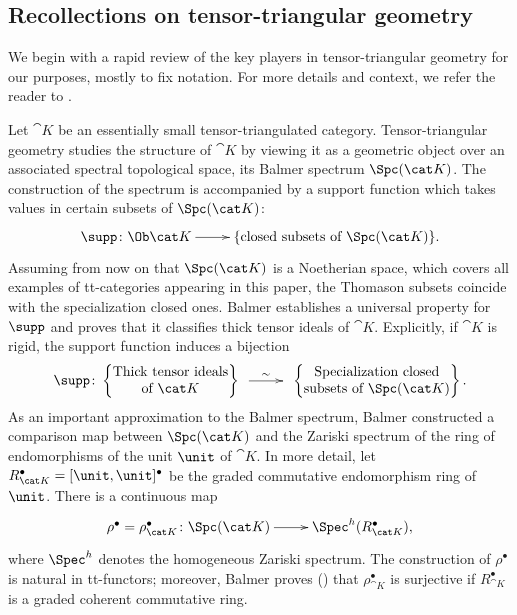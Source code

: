 \documentclass{amsart}%
\numberwithin{equation}{section}%
\theoremstyle{remark}
\begin{document}
\subsection{Recollections on tensor-triangular geometry}

We begin with a rapid review of the key players in tensor-triangular geometry for our purposes, mostly to fix notation. For more details and context, we refer the reader to \cite{Balmer05a}.

Let $\cat K$ be an essentially small tensor-triangulated category. Tensor-triangular geometry studies the structure of $\cat K$ by viewing it as a geometric object over an associated spectral topological space, its Balmer spectrum $\Spc(\cat K)$.
The construction of the spectrum is accompanied by a support function which takes values in certain subsets of $\Spc(\cat K)$:
\begin{equation}\label{eq:Balmersupport}
    \xymatrix{\supp\colon \Ob\cat K \ar[r] & \{\text{closed subsets of } \Spc(\cat K)\}.}
\end{equation}
Assuming from now on that $\Spc(\cat K)$ is a Noetherian space, which covers all examples of tt-categories appearing in this paper, the Thomason subsets coincide with the specialization closed ones. Balmer establishes a universal property for $\supp$ and proves that it classifies thick tensor ideals of $\cat K$. Explicitly, if $\cat K$ is rigid, the support function induces a bijection
\[
\supp\colon\begin{Bmatrix}
\text{Thick tensor ideals} \\
\text{of } \cat K
\end{Bmatrix} 
\xymatrix@C=2pc{ \ar[r]^-{\sim} &}
\begin{Bmatrix}
\text{Specialization closed} \\
\text{subsets of } \Spc(\cat K)
\end{Bmatrix}.
\]
As an important approximation to the Balmer spectrum, Balmer \cite{Balmer10b} constructed a comparison map between $\Spc(\cat K)$ and the Zariski spectrum of the ring of endomorphisms of the unit $\unit$ of $\cat K$. In more detail, let $R_{\cat K}^{\bullet} = [\unit,\unit]^{\bullet}$ be the graded commutative endomorphism ring of $\unit$. There is a continuous map
\begin{equation}\label{eq:Balmercomparisonmap}
    \xymatrix{\rho^{\bullet} = \rho_{\cat K}^{\bullet}\colon \Spc(\cat K) \ar[r] & \Spec^h(R_{\cat K}^{\bullet}),}
\end{equation}
where $\Spec^h$ denotes the homogeneous Zariski spectrum. The construction of $\rho^{\bullet}$ is natural in tt-functors; moreover, Balmer proves (\cite[Thm.~7.3]{Balmer10b}) that $\rho_{\cat K}^{\bullet}$ is surjective if $R_{\cat K}^{\bullet}$ is a graded coherent commutative ring.
\end{document}
